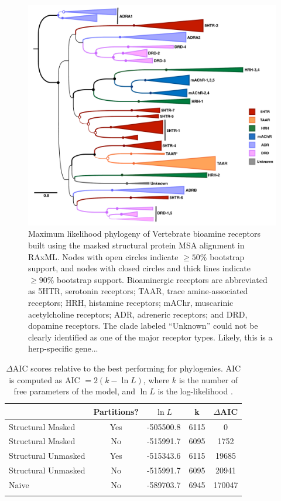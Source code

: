 \documentclass[fleqn,10pt]{wlpeerj}
\begin{document}
\begin{figure}[htbp]
	\centerline{\includegraphics[width=18cm]{figures/masked_part_phylogeny.pdf}}
	\caption{\label{phylogeny} Maximum likelihood phylogeny of Vertebrate bioamine receptors built using the masked structural protein MSA alignment in RAxML. Nodes with open circles indicate $\geq 50\%$ bootstrap support, and nodes with closed circles and thick lines indicate $\geq 90\%$ bootstrap support. Bioaminergic receptors are abbreviated as 5HTR, serotonin receptors; TAAR, trace amine-associated receptors; HRH, histamine receptors; mAChr, muscarinic acetylcholine receptors; ADR, adreneric receptors; and DRD, dopamine receptors. The clade labeled ``Unknown'' could not be clearly identified as one of the major receptor types. Likely, this is a herp-specific gene...}
\end{figure}

\newpage

\begin{table}[htbp]
	\centering
	\begin{tabular}{l c l l c}
		\hline\noalign{\smallskip}
		\multicolumn{1}{c}{Alignment} & \multicolumn{1}{c}{Partitions?} & \multicolumn{1}{c}{$\ln L$} & \multicolumn{1}{c}{k} & \multicolumn{1}{l}{$\Delta$AIC} \\
		\hline\noalign{\smallskip}
		Structural Masked & Yes & -505500.8 & 6115 & 0 \\
		Structural Masked & No & -515991.7 & 6095 & 1752 \\  
		Structural Unmasked & Yes & -515343.6 & 6115 & 19685 \\
		Structural Unmasked & No & -515991.7 & 6095 & 20941 \\ 
		Naive & No &  -589703.7 & 6945 & 170047 \\
		\noalign{\smallskip}\hline\noalign{\smallskip} 
	\end{tabular}
	\caption{\label{tab:phylo_AIC} $\Delta$AIC scores relative to the best performing for phylogenies.  AIC is computed as AIC $= 2(k - \ln L)$, where $k$ is the number of free parameters of the model, and $\ln L$ is the log-likelihood \citep{Akaike1974,BurnhamAnderson2004}.}
\end{table}
\end{document}
